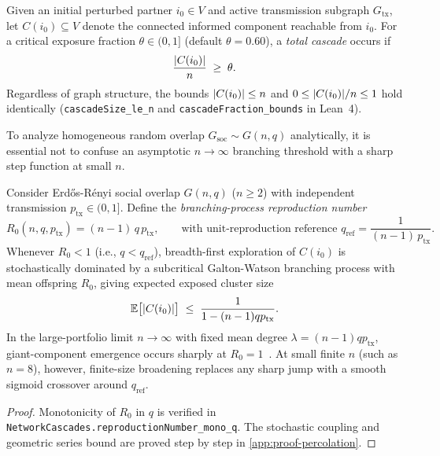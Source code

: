 \begin{definition}
\label{def:cascade}
Given an initial perturbed partner $i_0 \in V$ and active transmission subgraph $G_{\mathrm{tx}}$,
let $C(i_0) \subseteq V$ denote the connected informed component reachable from $i_0$.
For a critical exposure fraction $\theta \in (0, 1]$ (default $\theta = 0.60$), a
\emph{total cascade} occurs if
\begin{equation}
  \frac{\lvert C(i_0) \rvert}{n} \;\ge\; \theta.
  \label{eq:cascade-condition}
\end{equation}
Regardless of graph structure, the bounds $\lvert C(i_0) \rvert \le n$ and
$0 \le \lvert C(i_0) \rvert / n \le 1$ hold identically
(\texttt{cascadeSize\_le\_n} and \texttt{cascadeFraction\_bounds} in Lean~4).
\end{definition}

To analyze homogeneous random overlap $G_{\mathrm{soc}} \sim G(n, q)$ analytically,
it is essential not to confuse an asymptotic $n \to \infty$ branching threshold with a sharp
step function at small $n$.

\begin{theorem}
\label{thm:percolation-threshold}
Consider Erd\H{o}s-R\'enyi social overlap $G(n, q)$ ($n \ge 2$) with independent
transmission $p_{\mathrm{tx}} \in (0, 1]$. Define the \emph{branching-process reproduction
number}
\begin{equation}
  R_0(n, q, p_{\mathrm{tx}}) = (n - 1)\, q\, p_{\mathrm{tx}},
  \qquad \text{with unit-reproduction reference }
  q_{\mathrm{ref}} = \frac{1}{(n - 1)\, p_{\mathrm{tx}}}.
  \label{eq:q-crit}
\end{equation}
Whenever $R_0 < 1$ (i.e., $q < q_{\mathrm{ref}}$), breadth-first exploration of $C(i_0)$
is stochastically dominated by a subcritical Galton-Watson branching process with mean
offspring $R_0$, giving expected exposed cluster size
\begin{equation*}
  \mathbb{E}\bigl[\lvert C(i_0) \rvert\bigr] \;\le\; \frac{1}{1 - (n - 1) q p_{\mathrm{tx}}}.
\end{equation*}
In the large-portfolio limit $n \to \infty$ with fixed mean degree $\lambda = (n - 1) q p_{\mathrm{tx}}$,
giant-component emergence occurs sharply at $R_0 = 1$~\citep{bollobas1998modern,grimmett1999percolation}.
At small finite $n$ (such as $n = 8$), however, finite-size broadening replaces any sharp jump
with a smooth sigmoid crossover around $q_{\mathrm{ref}}$.
\end{theorem}
\begin{proof}
Monotonicity of $R_0$ in $q$ is verified in \texttt{NetworkCascades.\allowbreak{}reproductionNumber\_mono\_q}.
The stochastic coupling and geometric series bound are proved step by step in
\cref{app:proof-percolation}.
\end{proof}

